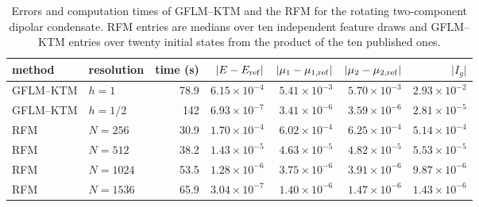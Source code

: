 \begin{table}[!htbp]
\centering
\small
\setlength{\tabcolsep}{4pt}
\caption{Errors and computation times of GFLM--KTM and the RFM for the rotating two-component dipolar condensate. RFM entries are medians over ten independent feature draws and GFLM--KTM entries over twenty initial states from the product of the ten published ones.}
\label{tab:dipolar_bec_comparison}
\begin{tabular}{llrrrrr}
\toprule
method & resolution & time (s) & \(\lvert E-E_{\rm ref}\rvert\) & \(\lvert\mu_1-\mu_{1,\rm ref}\rvert\) & \(\lvert\mu_2-\mu_{2,\rm ref}\rvert\) & \(\lvert I_g\rvert\)\\
\midrule
GFLM--KTM & \(h=1\) & 78.9 & \(6.15\times 10^{-4}\) & \(5.41\times 10^{-3}\) & \(5.70\times 10^{-3}\) & \(2.93\times 10^{-2}\)\\
GFLM--KTM & \(h=1/2\) & 142 & \(6.93\times 10^{-7}\) & \(3.41\times 10^{-6}\) & \(3.59\times 10^{-6}\) & \(2.81\times 10^{-5}\)\\
\midrule
RFM & \(N=256\) & 30.9 & \(1.70\times 10^{-4}\) & \(6.02\times 10^{-4}\) & \(6.25\times 10^{-4}\) & \(5.14\times 10^{-4}\)\\
RFM & \(N=512\) & 38.2 & \(1.43\times 10^{-5}\) & \(4.63\times 10^{-5}\) & \(4.82\times 10^{-5}\) & \(5.53\times 10^{-5}\)\\
RFM & \(N=1024\) & 53.5 & \(1.28\times 10^{-6}\) & \(3.75\times 10^{-6}\) & \(3.91\times 10^{-6}\) & \(9.87\times 10^{-6}\)\\
RFM & \(N=1536\) & 65.9 & \(3.04\times 10^{-7}\) & \(1.40\times 10^{-6}\) & \(1.47\times 10^{-6}\) & \(1.43\times 10^{-6}\)\\
\bottomrule
\end{tabular}
\end{table}
